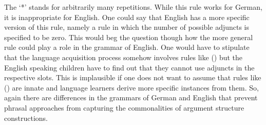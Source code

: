 \z
The `*' stands for arbitrarily many repetitions. While this rule works for German, it is
inappropriate for English. One could say that English has a more specific version of this rule,
namely a rule in which the number of possible adjuncts is specified to be zero. This would beg the
question though how the more general rule could play a role in the grammar of English. One would have to
stipulate that the language acquisition process somehow involves rules like () but the
English speaking children have to find out that they cannot use adjuncts in the respective
slots. This is implausible if one does not want to assume that rules like () are innate and
language learners derive more specific instances from them. So, again there are differences in the
grammars of German and English that prevent phrasal approaches from capturing the commonalities of
argument structure constructions.




